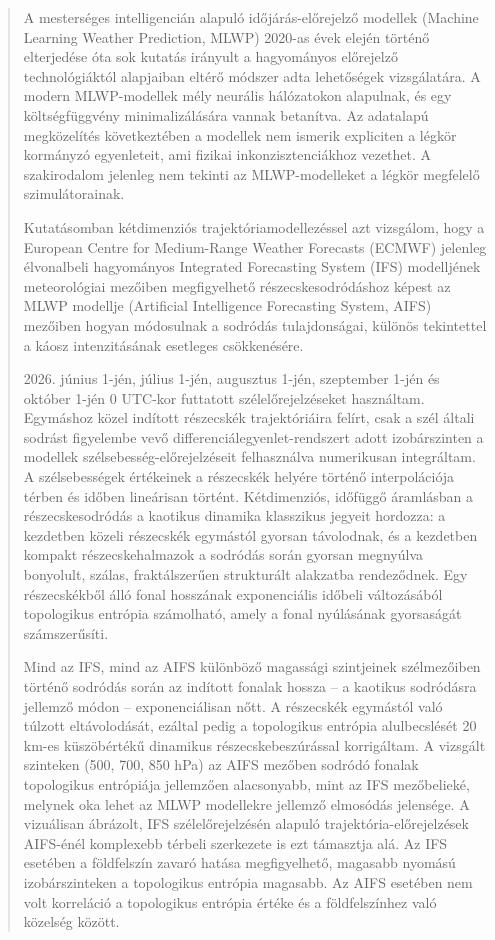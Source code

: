 \documentclass[12pt,a4paper]{article}
\begin{document}
\begin{abstract}
    A mesterséges intelligencián alapuló időjárás-előrejelző modellek (Machine Learning Weather Prediction, MLWP) 2020-as évek elején történő elterjedése óta sok kutatás irányult a hagyományos előrejelző technológiáktól alapjaiban eltérő módszer adta lehetőségek vizsgálatára. A modern MLWP-modellek mély neurális hálózatokon alapulnak, és egy költségfüggvény minimalizálására vannak betanítva. Az adatalapú megközelítés következtében a modellek nem ismerik expliciten a légkör kormányzó egyenleteit, ami fizikai inkonzisztenciákhoz vezethet. A szakirodalom jelenleg nem tekinti az MLWP-modelleket a légkör megfelelő szimulátorainak.

    Kutatásomban kétdimenziós trajektóriamodellezéssel azt vizsgálom, hogy a European Centre for Medium-Range Weather Forecasts (ECMWF) jelenleg élvonalbeli hagyományos Integrated Forecasting System (IFS) modelljének meteorológiai mezőiben megfigyelhető részecskesodródáshoz képest az MLWP modellje (Artificial Intelligence Forecasting System, AIFS) mezőiben hogyan módosulnak a sodródás tulajdonságai, különös tekintettel a káosz intenzitásának esetleges csökkenésére.

    2026. június 1-jén, július 1-jén, augusztus 1-jén, szeptember 1-jén és október 1-jén 0 UTC-kor futtatott szélelőrejelzéseket használtam. Egymáshoz közel indított részecskék trajektóriáira felírt, csak a szél általi sodrást figyelembe vevő differenciálegyenlet-rendszert adott izobárszinten a modellek szélsebesség-előrejelzéseit felhasználva numerikusan integráltam. A szélsebességek értékeinek a részecskék helyére történő interpolációja térben és időben lineárisan történt. Kétdimenziós, időfüggő áramlásban a részecskesodródás a kaotikus dinamika klasszikus jegyeit hordozza: a kezdetben közeli részecskék egymástól gyorsan távolodnak, és a kezdetben kompakt részecskehalmazok a sodródás során gyorsan megnyúlva bonyolult, szálas, fraktálszerűen strukturált alakzatba rendeződnek. Egy részecskékből álló fonal hosszának exponenciális időbeli változásából topologikus entrópia számolható, amely a fonal nyúlásának gyorsaságát számszerűsíti.

    Mind az IFS, mind az AIFS különböző magassági szintjeinek szélmezőiben történő sodródás során az indított fonalak hossza -- a kaotikus sodródásra jellemző módon -- exponenciálisan nőtt. A részecskék egymástól való túlzott eltávolodását, ezáltal pedig a topologikus entrópia alulbecslését 20 km-es küszöbértékű dinamikus részecskebeszúrással korrigáltam. A vizsgált szinteken (500, 700, 850 hPa) az AIFS mezőben sodródó fonalak topologikus entrópiája jellemzően alacsonyabb, mint az IFS mezőbelieké, melynek oka lehet az MLWP modellekre jellemző elmosódás jelensége. A vizuálisan ábrázolt, IFS szélelőrejelzésén alapuló trajektória-előrejelzések AIFS-énél komplexebb térbeli szerkezete is ezt támasztja alá. Az IFS esetében a földfelszín zavaró hatása megfigyelhető, magasabb nyomású izobárszinteken a topologikus entrópia magasabb. Az AIFS esetében nem volt korreláció a topologikus entrópia értéke és a földfelszínhez való közelség között.


\end{abstract}
\end{document}
